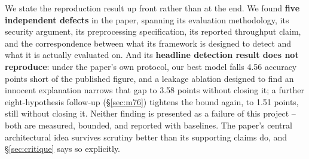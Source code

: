 \documentclass[conference]{IEEEtran}
\begin{document}
We state the reproduction result up front rather than at the end. We found \textbf{five
independent defects} in the paper, spanning its evaluation methodology, its security argument,
its preprocessing specification, its reported throughput claim, and the correspondence between
what its framework is designed to detect and what it is actually evaluated on. And its
\textbf{headline detection result does not reproduce}: under the paper's own protocol, our best
model falls 4.56 accuracy points short of the published figure, and a leakage ablation designed
to find an innocent explanation narrows that gap to 3.58 points without closing it; a further
eight-hypothesis follow-up (\S\ref{sec:m76}) tightens the bound again, to 1.51 points, still
without closing it. Neither finding is presented as a failure of this project -- both are
measured, bounded, and reported with baselines. The paper's central architectural idea survives
scrutiny better than its supporting claims do, and \S\ref{sec:critique} says so explicitly.
\end{document}
